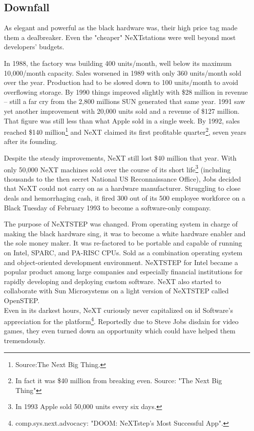 \subsection{Downfall}
As elegant and powerful as the black hardware was, their high price tag made them a dealbreaker. Even the "cheaper" NeXTstations were well beyond most developers' budgets.\\
\par
 In 1988, the factory was building 400 units/month, well below its maximum 10,000/month capacity. Sales worsened in 1989 with only 360 units/month sold over the year. Production had to be slowed down to 100 units/month to avoid overflowing storage. By 1990 things improved slightly with \$28 million in revenue -- still a far cry from the 2,800 millions SUN generated that same year. 1991 saw yet another improvement with 20,000 units sold and a revenue of \$127 million. That figure was still less than what Apple sold in a single week. By 1992, sales reached \$140 million\footnote{Source:The Next Big Thing.} and NeXT claimed its first profitable quarter\footnote{In fact it was \$40 million from breaking even. Source: "The Next Big Thing"}, seven years after its founding.\\
\par
Despite the steady improvements, NeXT still lost \$40 million that year. With only 50,000 NeXT machines sold over the course of its short life\footnote{In 1993 Apple sold 50,000 units every six days.} (including thousands to the then secret National US Reconnaissance Office), Jobs decided that NeXT could not carry on as a hardware manufacturer. Struggling to close deals and hemorrhaging cash, it fired 300 out of its 500 employee workforce on a Black Tuesday of February 1993 to become a software-only company.\\
\par
 The purpose of NeXTSTEP was changed. From operating system in charge of making the black hardware sing, it was to become a white hardware enabler and the sole money maker. It was re-factored to be portable and capable of running on Intel, SPARC, and PA-RISC CPUs. Sold as a combination operating system and object-oriented development environment. NeXTSTEP for Intel became a popular product among large companies and especially financial institutions for rapidly developing and deploying custom software. NeXT also started to collaborate with Sun Microsystems on a light version of NeXTSTEP called OpenSTEP.\\
Even in its darkest hours, NeXT curiously never capitalized on id Software's appreciation for the platform\footnote{comp.sys.next.advocacy: "DOOM: NeXTstep's Most Successful App".}. Reportedly due to Steve Jobs disdain for video games, they even turned down an opportunity which could have helped them tremendously.\\
\par

